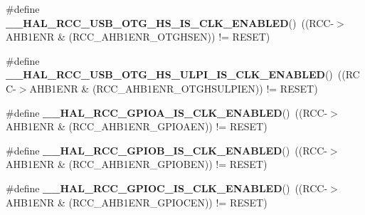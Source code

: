 \begin{DoxyCompactItemize}
\mbox{\label{group___r_c_c_ex___peripheral___clock___enable___disable___status_gafdd0ec36a385956cd1985a6595e366d8}} 
\#define {\bfseries \+\_\+\+\_\+\+H\+A\+L\+\_\+\+R\+C\+C\+\_\+\+U\+S\+B\+\_\+\+O\+T\+G\+\_\+\+H\+S\+\_\+\+I\+S\+\_\+\+C\+L\+K\+\_\+\+E\+N\+A\+B\+L\+ED}()~((R\+CC-\/$>$A\+H\+B1\+E\+NR \& (R\+C\+C\+\_\+\+A\+H\+B1\+E\+N\+R\+\_\+\+O\+T\+G\+H\+S\+EN)) != R\+E\+S\+ET)
\item 
\mbox{\label{group___r_c_c_ex___peripheral___clock___enable___disable___status_ga512dfe593947d251c924b586c9fc59fb}} 
\#define {\bfseries \+\_\+\+\_\+\+H\+A\+L\+\_\+\+R\+C\+C\+\_\+\+U\+S\+B\+\_\+\+O\+T\+G\+\_\+\+H\+S\+\_\+\+U\+L\+P\+I\+\_\+\+I\+S\+\_\+\+C\+L\+K\+\_\+\+E\+N\+A\+B\+L\+ED}()~((R\+CC-\/$>$A\+H\+B1\+E\+NR \& (R\+C\+C\+\_\+\+A\+H\+B1\+E\+N\+R\+\_\+\+O\+T\+G\+H\+S\+U\+L\+P\+I\+EN)) != R\+E\+S\+ET)
\item 
\mbox{\label{group___r_c_c_ex___peripheral___clock___enable___disable___status_gad1edbd9407c814110f04c1a609a214e4}} 
\#define {\bfseries \+\_\+\+\_\+\+H\+A\+L\+\_\+\+R\+C\+C\+\_\+\+G\+P\+I\+O\+A\+\_\+\+I\+S\+\_\+\+C\+L\+K\+\_\+\+E\+N\+A\+B\+L\+ED}()~((R\+CC-\/$>$A\+H\+B1\+E\+NR \& (R\+C\+C\+\_\+\+A\+H\+B1\+E\+N\+R\+\_\+\+G\+P\+I\+O\+A\+EN)) != R\+E\+S\+ET)
\item 
\mbox{\label{group___r_c_c_ex___peripheral___clock___enable___disable___status_ga2fc8f9dc5f5b64c14c325c45ee301b4f}} 
\#define {\bfseries \+\_\+\+\_\+\+H\+A\+L\+\_\+\+R\+C\+C\+\_\+\+G\+P\+I\+O\+B\+\_\+\+I\+S\+\_\+\+C\+L\+K\+\_\+\+E\+N\+A\+B\+L\+ED}()~((R\+CC-\/$>$A\+H\+B1\+E\+NR \& (R\+C\+C\+\_\+\+A\+H\+B1\+E\+N\+R\+\_\+\+G\+P\+I\+O\+B\+EN)) != R\+E\+S\+ET)
\item 
\mbox{\label{group___r_c_c_ex___peripheral___clock___enable___disable___status_ga528029c120a0154dfd7cfd6159e8debe}} 
\#define {\bfseries \+\_\+\+\_\+\+H\+A\+L\+\_\+\+R\+C\+C\+\_\+\+G\+P\+I\+O\+C\+\_\+\+I\+S\+\_\+\+C\+L\+K\+\_\+\+E\+N\+A\+B\+L\+ED}()~((R\+CC-\/$>$A\+H\+B1\+E\+NR \& (R\+C\+C\+\_\+\+A\+H\+B1\+E\+N\+R\+\_\+\+G\+P\+I\+O\+C\+EN)) != R\+E\+S\+ET)

\end{DoxyCompactItemize}
